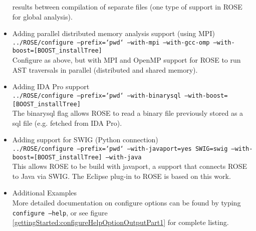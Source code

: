 \begin{itemize}
         results between compilation of separate files (one type of support in ROSE for
         global analysis).
   \item Adding parallel distributed memory analysis support (using MPI) \\
         {\tt ../ROSE/configure --prefix=`pwd` --with-mpi --with-gcc-omp --with-boost=[BOOST\_installTree]} \\
         Configure as above, but with MPI and OpenMP support for ROSE to run AST traversals
         in parallel (distributed and shared memory).
   \item Adding IDA Pro support \\
         {\tt ../ROSE/configure --prefix=`pwd` --with-binarysql --with-boost=[BOOST\_installTree]} \\
         The binarysql flag allows ROSE to read a binary file previously stored as a sql file (e.g. fetched from
         IDA Pro). 
   \item Adding support for SWIG (Python connection) \\
         {\tt ../ROSE/configure --prefix=`pwd` --with-javaport=yes SWIG=swig --with-boost=[BOOST\_installTree] --with-java} \\
         This allows ROSE to be build with javaport, a support that connects ROSE to Java via SWIG.
         The Eclipse plug-in to ROSE is based on this work.
   \item Additional Examples \\ 
         More detailed documentation on configure options can be found by typing 
         {\tt configure --help}, or see figure
         \ref{gettingStarted:configureHelpOptionOutputPart1} for complete
         listing.
\end{itemize}




